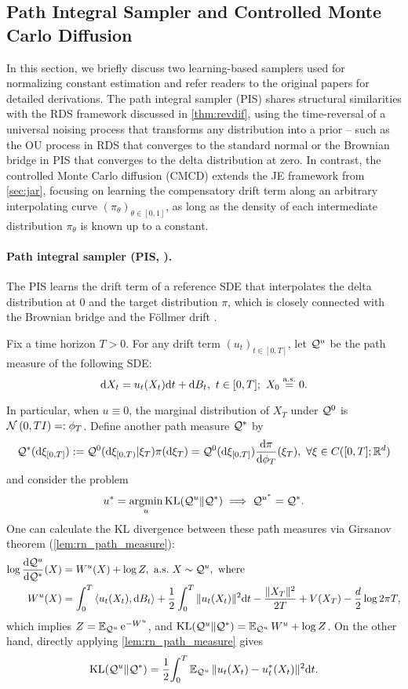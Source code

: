 \subsection{Path Integral Sampler and Controlled Monte Carlo Diffusion}
\label{app:rel_work_pis_cmcd}
In this section, we briefly discuss two learning-based samplers used for normalizing constant estimation and refer readers to the original papers for detailed derivations. The path integral sampler (PIS) shares structural similarities with the RDS framework discussed in \cref{thm:revdif}, using the time-reversal of a universal noising process that transforms any distribution into a prior -- such as the OU process in RDS that converges to the standard normal or the Brownian bridge in PIS that converges to the delta distribution at zero. In contrast, the controlled Monte Carlo diffusion (CMCD) extends the JE framework from \cref{sec:jar}, focusing on learning the compensatory drift term along an arbitrary interpolating curve $(\pi_\theta)_{\theta\in[0,1]}$, as long as the density of each intermediate distribution $\pi_\theta$ is known up to a constant.

\paragraph{Path integral sampler (PIS, \citet{zhang2022path}).} The PIS learns the drift term of a reference SDE that interpolates the delta distribution at $0$ and the target distribution $\pi$, which is closely connected with the Brownian bridge and the F\"ollmer drift \citep{chewi2022log}.

Fix a time horizon $T>0$. For any drift term $(u_t)_{t\in[0,T]}$, let $\mathcal{Q}^u$ be the path measure of the following SDE:
$$\mathrm{d} X_t=u_t(X_t)\mathrm{d} t+\mathrm{d} B_t,~t\in[0,T];~X_0\stackrel{\mathrm{a.s.}}{=}0.$$

In particular, when $u\equiv0$, the marginal distribution of $X_T$ under $\mathcal{Q}^0$ is $\operatorname{\mathcal{N}}\left(0,TI\right)=:\phi_T$. Define another path measure $\mathcal{Q}^*$ by
\begin{equation*}
    \mathcal{Q}^*(\mathrm{d}\xi_{[0,T]}):=\mathcal{Q}^0(\mathrm{d}\xi_{[0,T)}|\xi_T)\pi(\mathrm{d}\xi_T)=\mathcal{Q}^0(\mathrm{d}\xi_{[0,T]})\frac{\mathrm{d}\pi}{\mathrm{d}\phi_T}(\xi_T),~\forall\xi\in C([0,T];\mathbb{R}^d)
    \label{eq:pis_qstar}
\end{equation*}
and consider the problem
$$u^*=\mathop\mathrm{argmin}_u\operatorname{KL}(\mathcal{Q}^u\|\mathcal{Q}^*)\implies\mathcal{Q}^{u^*}=\mathcal{Q}^*.$$ 
One can calculate the KL divergence between these path measures via Girsanov theorem (\cref{lem:rn_path_measure}): 
\begin{align*}
    \log\frac{\mathrm{d}\mathcal{Q}^u}{\mathrm{d}\mathcal{Q}^*}(X)&=W^u(X)+\log Z,~\text{a.s.}~X\sim\mathcal{Q}^u,~\text{where}\\
    W^u(X)&=\int_0^T\left\langle u_t(X_t),\mathrm{d} B_t\right\rangle+\frac{1}{2}\int_0^T\|u_t(X_t)\|^2\mathrm{d} t-\frac{\|X_T\|^2}{2T}+V(X_T)-\frac{d}{2}\log2\pi T,
\end{align*}
which implies $Z=\operatorname{\mathbb{E}}_{\mathcal{Q}^u}{\mathrm{e}^{-W^u}}$, and $\operatorname{KL}(\mathcal{Q}^u\|\mathcal{Q}^*)=\operatorname{\mathbb{E}}_{\mathcal{Q}^u}{W^u}+\log Z$. On the other hand, directly applying \cref{lem:rn_path_measure} gives 
$$\operatorname{KL}(\mathcal{Q}^u\|\mathcal{Q}^*)=\frac{1}{2}{\int_0^T\operatorname{\mathbb{E}}_{\mathcal{Q}^u}\|u_t(X_t)-u^*_t(X_t)\|^2\mathrm{d} t}.$$

